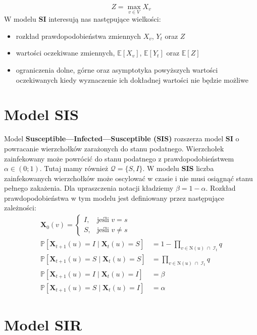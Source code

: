 \[
    Z = \max_{v \in V} X_v
\]
W modelu \textbf{SI} interesują nas następujące wielkości:
\begin{itemize}
    \item rozkład prawdopodobieństwa zmiennych $X_v$, $Y_t$ oraz $Z$
    \item wartości oczekiwane zmiennych, $\mathbb{E}[X_v]$, $\mathbb{E}[Y_t]$ oraz $\mathbb{E}[Z]$
    \item ograniczenia dolne, górne oraz asymptotyka powyższych wartości oczekiwanych kiedy wyznaczenie ich dokładnej wartości nie będzie możliwe
\end{itemize}



\section{Model SIS}

Model \textbf{Susceptible—Infected—Susceptible (SIS)} rozszerza model \textbf{SI} o powracanie wierzchołków zarażonych do stanu podatnego. Wierzchołek zainfekowany może powrócić do stanu podatnego z prawdopodobieństwem $\alpha \in (0;1)$. Tutaj mamy również $\mathcal{Q} = \{S, I\}$.
W modelu \textbf{SIS} liczba zainfekowanych wierzchołków może oscylować w czasie i nie musi osiągnąć stanu pełnego zakażenia. Dla upraszczenia notacji kładziemy $\beta=1-\alpha $.
Rozkład prawdopodobieństwa w tym modelu jest definiowany przez następujące zależności:
\[
\begin{aligned}
\mathbf{X}_0(v) =
\begin{cases}
I, & \text{jeśli } v = s \\[4pt]
S, & \text{jeśli } v \neq s
\end{cases} \\
\mathbb{P}[\mathbf{X}_{t+1}(u) = I \mid \mathbf{X}_t(u) = S]
 &= 1 - \prod_{v \in \mathrm{N}(u) \;\cap\; \mathcal{I}_t} q \\[6pt]
\mathbb{P}[\mathbf{X}_{t+1}(u) = S \mid \mathbf{X}_t(u) = S]
 &= \prod_{v \in \mathrm{N}(u) \;\cap\; \mathcal{I}_t} q \\[6pt]
\mathbb{P}[\mathbf{X}_{t+1}(u) = I \mid \mathbf{X}_t(u) = I]
 &= \beta \\[6pt]
\mathbb{P}[\mathbf{X}_{t+1}(u) = S \mid \mathbf{X}_t(u) = I]
 &= \alpha
\end{aligned}
\]


\section{Model SIR}

